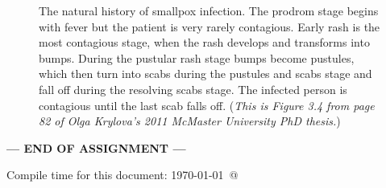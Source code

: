 \documentclass[12pt]{article}\usepackage[]{graphicx}\usepackage[]{color}
\begin{document}
%
\begin{figure}[h]
\begin{center}
\end{center}
\caption{The natural history of smallpox infection. The prodrom stage begins with fever but the patient is very rarely contagious. Early rash is the most contagious stage, when the rash develops and transforms into bumps. During the pustular rash stage bumps become pustules, which then turn into scabs during the pustules and scabs stage and fall off during the resolving scabs stage. The infected person is contagious until the last scab falls off.  (\emph{This is Figure 3.4 from page 82 of Olga Krylova's 2011 McMaster University PhD thesis.})}
\label{F:smpxnathist}
\end{figure}
%

\bigskip
\centerline{\bf--- END OF ASSIGNMENT ---}

\bigskip
Compile time for this document:
\today\ @ \thistime
\end{document}
